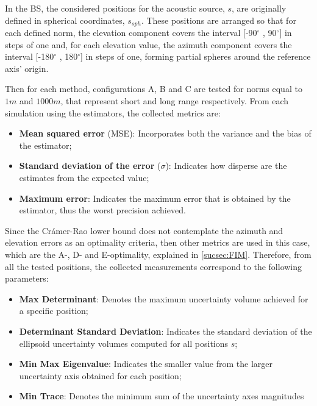 In the BS, the considered positions for the acoustic source, $s$, are originally defined in spherical coordinates, $s_{sph}$. These positions are arranged so that for each defined norm, the elevation component covers the interval [-90$^{\circ}$ , 90$^{\circ}$] in steps of one and, for each elevation value, the azimuth component covers the interval [-180$^{\circ}$ , 180$^{\circ}$] in steps of one, forming partial spheres around the reference axis' origin.

Then for each method, configurations A, B and C are tested for norms equal to $1m$ and $1000m$, that represent short and long range respectively. From each simulation using the estimators, the collected metrics are:
 
\begin{itemize}
	\item \textbf{Mean squared error} (MSE): Incorporates both the variance and the bias of the estimator;
	
	\item \textbf{Standard deviation of the error} ($\sigma$): Indicates how disperse are the estimates from the expected value;
	
	\item \textbf{Maximum error}: Indicates the maximum error that is obtained by the estimator, thus the worst precision achieved.
\end{itemize} 

Since the Crámer-Rao lower bound does not contemplate the azimuth and elevation errors as an optimality criteria, then other metrics are used in this case, which are the A-, D- and E-optimality, explained in \ref{sucsec:FIM}. Therefore, from all the tested positions, the collected measurements correspond to the following parameters: 

\begin{itemize}
	\item \textbf{Max Determinant}: Denotes the maximum uncertainty volume achieved for a specific position;
	
	\item \textbf{Determinant Standard Deviation}: Indicates the standard deviation of the ellipsoid uncertainty volumes computed for all positions $s$;
	
	\item \textbf{Min Max Eigenvalue}: Indicates the smaller value from the larger uncertainty axis obtained for each position;
	
	\item \textbf{ Min Trace}: Denotes the minimum sum of the uncertainty axes magnitudes
\end{itemize} 

